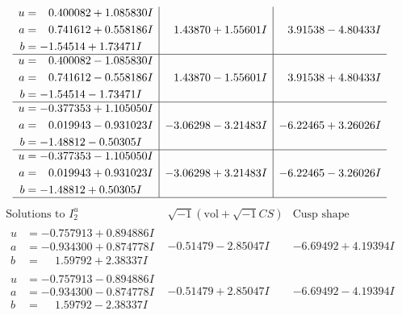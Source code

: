 \documentclass[1p]{elsarticle_modified}
\theoremstyle{definition}
\newcommand{\I}{\sqrt{-1}}
\begin{document}
$$\begin{array}{c|c|c}
\begin{aligned}
u &= \phantom{-}0.400082 + 1.085830 I \\
a &= \phantom{-}0.741612 + 0.558186 I \\
b &= -1.54514 + 1.73471 I\end{aligned}
 & \phantom{-}1.43870 + 1.55601 I & \phantom{-}3.91538 - 4.80433 I \\ \hline\begin{aligned}
u &= \phantom{-}0.400082 - 1.085830 I \\
a &= \phantom{-}0.741612 - 0.558186 I \\
b &= -1.54514 - 1.73471 I\end{aligned}
 & \phantom{-}1.43870 - 1.55601 I & \phantom{-}3.91538 + 4.80433 I \\ \hline\begin{aligned}
u &= -0.377353 + 1.105050 I \\
a &= \phantom{-}0.019943 - 0.931023 I \\
b &= -1.48812 - 0.50305 I\end{aligned}
 & -3.06298 - 3.21483 I & -6.22465 + 3.26026 I \\ \hline\begin{aligned}
u &= -0.377353 - 1.105050 I \\
a &= \phantom{-}0.019943 + 0.931023 I \\
b &= -1.48812 + 0.50305 I\end{aligned}
 & -3.06298 + 3.21483 I & -6.22465 - 3.26026 I\\
 \hline 
 \end{array}$$\newpage$$\begin{array}{c|c|c}  
\text{Solutions to }I^u_{2}& \I (\text{vol} + \sqrt{-1}CS) & \text{Cusp shape}\\
 \hline 
\begin{aligned}
u &= -0.757913 + 0.894886 I \\
a &= -0.934300 + 0.874778 I \\
b &= \phantom{-}1.59792 + 2.38337 I\end{aligned}
 & -0.51479 - 2.85047 I & -6.69492 + 4.19394 I \\ \hline\begin{aligned}
u &= -0.757913 - 0.894886 I \\
a &= -0.934300 - 0.874778 I \\
b &= \phantom{-}1.59792 - 2.38337 I\end{aligned}
 & -0.51479 + 2.85047 I & -6.69492 - 4.19394 I \\ \hline\begin{aligned}

\end{aligned}
\end{array}$$
\end{document}
